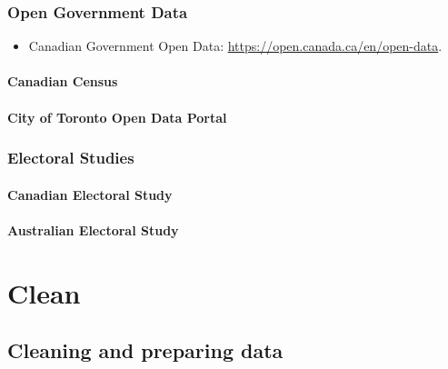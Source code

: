 \documentclass[
]{book}
\providecommand{\tightlist}{%
  \setlength{\itemsep}{0pt}\setlength{\parskip}{0pt}}
\begin{document}
\hypertarget{open-government-data}{%
\section{Open Government Data}\label{open-government-data}}

\begin{itemize}
\tightlist
\item
  Canadian Government Open Data: \url{https://open.canada.ca/en/open-data}.
\end{itemize}

\hypertarget{canadian-census}{%
\subsection{Canadian Census}\label{canadian-census}}

\hypertarget{city-of-toronto-open-data-portal}{%
\subsection{City of Toronto Open Data Portal}\label{city-of-toronto-open-data-portal}}

\hypertarget{electoral-studies}{%
\section{Electoral Studies}\label{electoral-studies}}

\hypertarget{canadian-electoral-study}{%
\subsection{Canadian Electoral Study}\label{canadian-electoral-study}}

\hypertarget{australian-electoral-study}{%
\subsection{Australian Electoral Study}\label{australian-electoral-study}}

\hypertarget{part-clean}{%
\part{Clean}\label{part-clean}}

\hypertarget{cleaning-and-preparing-data}{%
\chapter{Cleaning and preparing data}\label{cleaning-and-preparing-data}}
\end{document}
